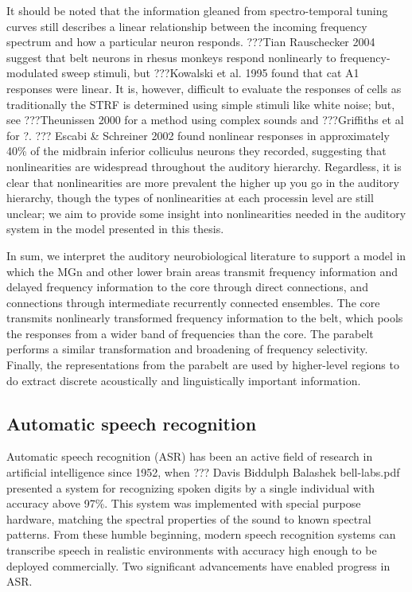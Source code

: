 It should be noted
that the information gleaned from
spectro-temporal tuning curves
still describes a linear relationship
between the incoming frequency spectrum
and how a particular neuron responds.
???Tian Rauschecker 2004
suggest that belt neurons
in rhesus monkeys respond nonlinearly
to frequency-modulated sweep stimuli,
but ???Kowalski et al. 1995
found that cat A1 responses were linear.
It is, however, difficult to evaluate
the responses of cells
as traditionally the STRF
is determined using simple stimuli
like white noise;
but, see ???Theunissen 2000
for a method using complex sounds
and ???Griffiths et al for ?.
??? Escabi \& Schreiner 2002
found nonlinear responses
in approximately 40\%
of the midbrain inferior colliculus
neurons they recorded,
suggesting that nonlinearities
are widespread
throughout the auditory hierarchy.
Regardless, it is clear that
nonlinearities are more prevalent
the higher up you go in the auditory hierarchy,
though the types of nonlinearities
at each processin level are still unclear;
we aim to provide some insight into
nonlinearities needed in the auditory system
in the model presented in this thesis.

In sum, we interpret
the auditory neurobiological literature
to support a model in which
the MGn and other lower brain areas
transmit frequency information
and delayed frequency information
to the core through direct connections,
and connections through intermediate
recurrently connected ensembles.
The core transmits nonlinearly transformed
frequency information to the belt,
which pools the responses from
a wider band of frequencies than the core.
The parabelt performs a similar transformation
and broadening of frequency selectivity.
Finally, the representations from the parabelt
are used by higher-level regions to
do extract discrete
acoustically and linguistically
important information.

\subsection{Automatic speech recognition}

Automatic speech recognition (ASR) has been
an active field of research
in artificial intelligence since 1952,
when ??? Davis Biddulph Balashek bell-labs.pdf
presented a system for recognizing
spoken digits by a single individual
with accuracy above 97\%.
This system was implemented
with special purpose hardware,
matching the spectral properties of
the sound to known spectral patterns.
From these humble beginning,
modern speech recognition systems
can transcribe speech
in realistic environments
with accuracy high enough
to be deployed commercially.
Two significant advancements
have enabled progress in ASR.

